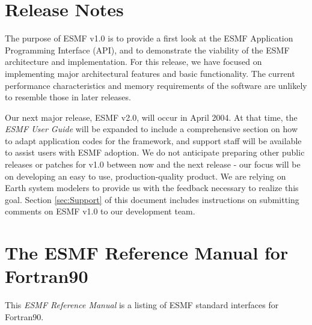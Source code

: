 
\section{Release Notes}

The purpose of ESMF v1.0 is to provide a first look at the ESMF
Application Programming Interface (API), and to demonstrate the viability 
of the ESMF architecture and implementation.  For this release, we have focused 
on implementing major architectural features and basic functionality.  The 
current performance characteristics and memory requirements of the software 
are unlikely to resemble those in later releases.

Our next major release, ESMF v2.0, will occur in April 2004.  At that time, 
the {\it ESMF User Guide} will be expanded to include a comprehensive section 
on how to adapt application codes for the framework, and support staff will be 
available to assist users with ESMF adoption.  We do not anticipate preparing other public
releases or patches for v1.0 between now and the next release - our focus
will be on developing an easy to use, production-quality product.  We are 
relying on Earth system modelers to provide us with the feedback necessary 
to realize this goal.  Section \ref{sec:Support} of this document includes 
instructions on submitting comments on ESMF v1.0 to our development team.

\section{The ESMF Reference Manual for Fortran90}

This {\it ESMF Reference Manual} is a listing of ESMF standard interfaces
for Fortran90.  

















